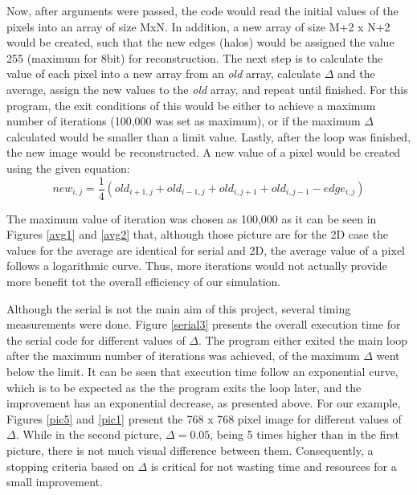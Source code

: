 \documentclass[11pt]{article}
\begin{document}
	Now, after arguments were passed, the code would read the initial values of the pixels into an array of size MxN. In addition, a new array of size M+2 x N+2 would be created, such that the new edges (halos) would be assigned the value 255 (maximum for 8bit) for reconstruction. The next step is to calculate the value of each pixel into a new array from an \textit{old} array, calculate $\Delta$ and the average, assign the new values to the \textit{old} array, and repeat until finished. For this program, the exit conditions of this would be either to achieve a maximum number of iterations (100,000 was set as maximum), or if the maximum $\Delta$ calculated would be smaller than a limit value. Lastly, after the loop was finished, the new image would be reconstructed. A new value of a pixel would be created using the given equation:
	$$new_{i,j} = \frac{1}{4}(old_{i+1,j} + old_{i-1,j} + old_{i,j+1} + old_{i,j-1} - edge_{i,j})$$
	
	The maximum value of iteration was chosen as 100,000 as it can be seen in Figures \ref{avg1} and \ref{avg2} that, although those picture are for the 2D case the values for the average are identical for serial and 2D, the average value of a pixel follows a logarithmic curve. Thus, more iterations would not actually provide more benefit tot the overall efficiency of our simulation.
	
	Although the serial is not the main aim of this project, several timing measurements were done. Figure \ref{serial3} presents the overall execution time for the serial code for different values of $\Delta$. The program either exited the main loop after the maximum number of iterations was achieved, of the maximum $\Delta$ went below the limit. It can be seen that execution time follow an exponential curve, which is to be expected as the the program exits the loop later, and the improvement has an exponential decrease, as presented above. For our example, Figures \ref{pic5} and \ref{pic1} present the 768 x 768 pixel image for different values of $\Delta$. While in the second picture, $\Delta=0.05$, being 5 times higher than in the first picture, there is not much visual difference between them. Consequently, a stopping criteria based on $\Delta$ is critical for not wasting time and resources for a small improvement.
	
\end{document}
